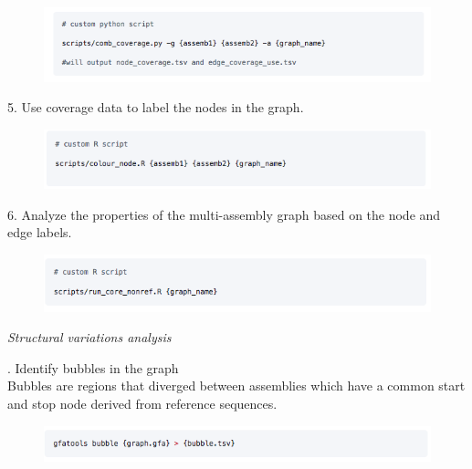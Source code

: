 \documentclass[../main.tex]{subfiles}
\begin{document}
\begin{flushleft}
    \vspace{3mm}
    \begin{figure}[!htb]
        \centering
        \includegraphics[width=\textwidth]{paper3/supplement/sp424.png}
    \end{figure}
5. Use coverage data to label the nodes in the graph. \\
    \vspace{3mm}
    \begin{figure}[!htb]
        \centering
        \includegraphics[width=\textwidth]{paper3/supplement/sp425.png}
    \end{figure}

6. Analyze the properties of the multi-assembly graph based on the node and edge labels. \\
    \vspace{3mm}
    \begin{figure}[!htb]
        \centering
        \includegraphics[width=\textwidth]{paper3/supplement/sp426.png}
    \end{figure}

\bigskip

\emph{Structural variations analysis}

. Identify bubbles in the graph \\ Bubbles are regions that diverged between assemblies which have a common start and stop node derived from reference sequences. \\
\vspace{3mm}
\begin{figure}[!htb]
    \centering
    \includegraphics[width=\textwidth]{paper3/supplement/sp429.png}
\end{figure}


\end{flushleft}
\end{document}
